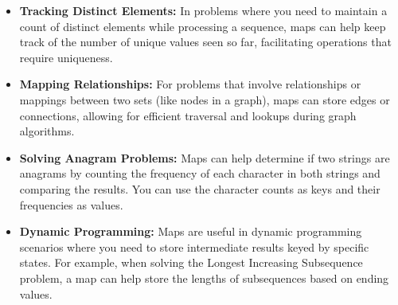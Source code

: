 \documentclass[12pt, letterpaper]{report}
\begin{document}
\begin{enumerate}
\begin{itemize}
\item \textbf{Tracking Distinct Elements:} In problems where you need to maintain a count of distinct elements while processing a sequence, maps can help keep track of the number of unique values seen so far, facilitating operations that require uniqueness.

\item \textbf{Mapping Relationships:} For problems that involve relationships or mappings between two sets (like nodes in a graph), maps can store edges or connections, allowing for efficient traversal and lookups during graph algorithms.

\item \textbf{Solving Anagram Problems:} Maps can help determine if two strings are anagrams by counting the frequency of each character in both strings and comparing the results. You can use the character counts as keys and their frequencies as values.

\item \textbf{Dynamic Programming:} Maps are useful in dynamic programming scenarios where you need to store intermediate results keyed by specific states. For example, when solving the Longest Increasing Subsequence problem, a map can help store the lengths of subsequences based on ending values.

\end{itemize}
\end{enumerate}
\end{document}
